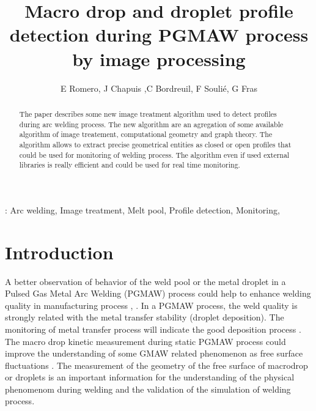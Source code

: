 \documentclass[12pt]{iopart}
\begin{document}


\title[Macro drop and droplet profile detection during PGMAW process by image processing]
{Macro drop and droplet profile detection during PGMAW process by image processing}

\author{E Romero, J Chapuis ,C Bordreuil, F Souli\'e, G Fras}

\address{Laboratoire de M\'ecanique et G\'enie Civil,
CC048, Place Eug\`ene Bataillon, Universit\'e Montpellier 2,
34095 Montpellier, France}

\begin{abstract}
The paper describes some new image treatment algorithm used to 
detect profiles during arc welding process. The new algorithm 
are an agregation of some available algorithm of image treatement,
computational geometry and graph theory. The algorithm allows to extract precise
geometrical entities as closed or open profiles that could be used for monitoring
of welding process. The algorithm even if used external libraries is really efficient
and could be used for real time monitoring.
\end{abstract}

: Arc welding, Image treatment, Melt pool,  Profile detection, Monitoring, 
\submitto{\MST}
\maketitle

\section{Introduction}

A better observation of behavior of the weld pool or the metal droplet in a Pulsed Gas Metal Arc Welding (PGMAW)
 process could help to enhance welding quality in manufacturing process \cite{LIN}, \cite{WU1}.
 In a PGMAW process, the weld quality is strongly related with the metal transfer  stability 
 (droplet deposition). The monitoring of metal transfer process
 will indicate the good deposition process \cite{WANG}. 
The macro drop kinetic measurement during static PGMAW process could improve the
understanding of some GMAW related phenomenon  \cite{CHO} as free surface 
fluctuations \cite{WANG}. The measurement of the geometry of the free surface 
of macrodrop or droplets is an important information for the understanding of the physical phenomenom 
during welding and
the validation of the simulation of welding process.
\end{document}
